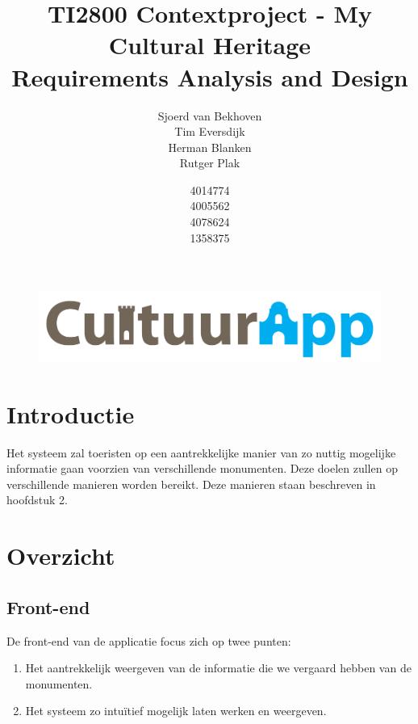 \documentclass[a4paper,10pt]{article}
\begin{document}
\title{TI2800 Contextproject - My Cultural Heritage\\ Requirements Analysis and Design}
\author{Sjoerd van Bekhoven\\ Tim Eversdijk \\ Herman Blanken \\ Rutger Plak \and 4014774 \\ 4005562 \\ 4078624 \\ 1358375}

\maketitle
\setcounter{page}{0}
\thispagestyle{empty}
\vspace{10cm}
		\begin{figure}[ht!]
				\centering
				\includegraphics[width=\textwidth]{cultuurapp-logo.png}
			\end{figure}
\clearpage

\tableofcontents

\clearpage
\section{Introductie}
Het systeem zal toeristen op een aantrekkelijke manier van zo nuttig mogelijke informatie gaan voorzien van verschillende monumenten. Deze doelen zullen op verschillende manieren worden bereikt. Deze manieren staan beschreven in hoofdstuk 2.

\clearpage
	\section{Overzicht}
		\subsection{Front-end}
			De front-end van de applicatie focus zich op twee punten:
			\begin{enumerate}
				\item Het aantrekkelijk weergeven van de informatie die we vergaard hebben van de monumenten.
				\item Het systeem zo intu\"itief mogelijk laten werken en weergeven.
			\end{enumerate}
				
\end{document}
